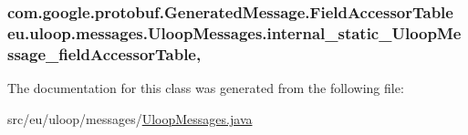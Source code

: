 \hypertarget{classeu_1_1uloop_1_1messages_1_1UloopMessages_ae0cd74209ad30222560d98b1f128284b}{
\subsubsection[{internal\+\_\+static\+\_\+\+Uloop\+Message\+\_\+field\+Accessor\+Table}]{\setlength{\rightskip}{0pt plus 5cm}com.\+google.\+protobuf.\+Generated\+Message.\+Field\+Accessor\+Table eu.\+uloop.\+messages.\+Uloop\+Messages.\+internal\+\_\+static\+\_\+\+Uloop\+Message\+\_\+field\+Accessor\+Table\hspace{0.3cm}{\ttfamily [static]}, {\ttfamily [private]}}}\label{classeu_1_1uloop_1_1messages_1_1UloopMessages_ae0cd74209ad30222560d98b1f128284b}


The documentation for this class was generated from the following file\+:\begin{DoxyCompactItemize}
\item 
src/eu/uloop/messages/\hyperlink{UloopMessages_8java}{Uloop\+Messages.\+java}\end{DoxyCompactItemize}
